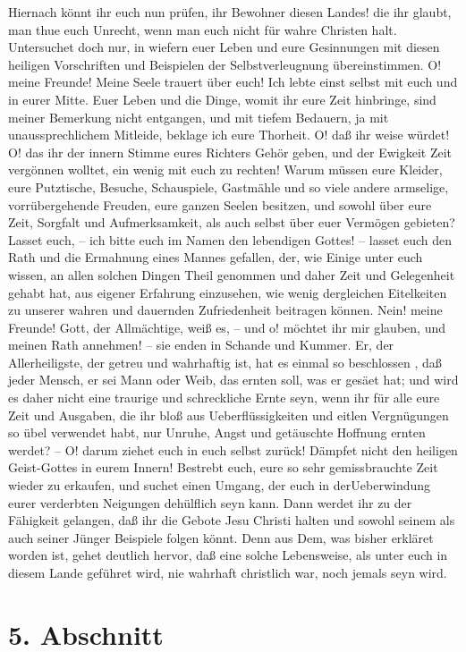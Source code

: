 Hiernach könnt ihr euch nun prüfen, ihr Bewohner diesen Landes! die ihr glaubt,
man thue euch Unrecht, wenn man euch nicht für wahre Christen halt. Untersuchet
doch nur, in wiefern euer Leben und eure Gesinnungen mit diesen heiligen
Vorschriften und Beispielen der Selbstverleugnung übereinstimmen. O! meine
Freunde! Meine Seele trauert über euch! Ich lebte einst selbst mit euch und in
eurer Mitte. Euer Leben und die Dinge, womit ihr eure Zeit hinbringe, sind
meiner Bemerkung nicht entgangen, und mit tiefem Bedauern, ja mit
unaussprechlichem Mitleide, beklage ich eure Thorheit. O! daß ihr weise würdet!
O! das ihr der innern Stimme eures Richters Gehör geben, und der Ewigkeit Zeit
vergönnen wolltet, ein wenig mit euch zu rechten! Warum müssen eure Kleider,
eure Putztische, Besuche, Schauspiele, Gastmähle und so viele andere armselige,
vorrübergehende Freuden, eure ganzen Seelen besitzen, und sowohl über eure Zeit,
Sorgfalt und Aufmerksamkeit, als auch selbst über euer Vermögen gebieten? Lasset
euch, -- ich bitte euch im Namen den lebendigen Gottes! -- lasset euch den Rath
und die Ermahnung eines Mannes gefallen, der, wie Einige unter euch wissen, an
allen solchen Dingen Theil genommen und daher Zeit und Gelegenheit gehabt hat,
aus eigener Erfahrung einzusehen, wie wenig dergleichen Eitelkeiten zu unserer
wahren und dauernden Zufriedenheit beitragen können. Nein! meine Freunde! Gott,
der Allmächtige, weiß es, -- und o! möchtet ihr mir glauben, und meinen Rath
annehmen! -- sie enden in Schande und Kummer. Er, der Allerheiligste, der getreu
und wahrhaftig ist, hat es einmal so beschlossen , daß jeder Mensch, er sei Mann
oder Weib, das ernten soll, was er gesäet hat; und wird es daher nicht eine
traurige und schreckliche Ernte seyn, wenn ihr für alle eure Zeit und Ausgaben,
die ihr bloß aus Ueberflüssigkeiten und eitlen Vergnügungen so übel verwendet
habt, nur Unruhe, Angst und getäuschte Hoffnung ernten werdet? -- O! darum
ziehet euch in euch selbst zurück! Dämpfet nicht den heiligen Geist-Gottes in
eurem Innern! Bestrebt  euch, eure so sehr gemissbrauchte Zeit wieder zu
erkaufen, und suchet einen Umgang, der euch in derUeberwindung eurer verderbten
Neigungen dehülflich seyn kann. Dann werdet ihr zu der Fähigkeit gelangen, daß
ihr die Gebote Jesu Christi halten und sowohl seinem als auch seiner Jünger
Beispiele folgen könnt. Denn aus Dem, was bisher erkläret worden ist, gehet
deutlich hervor, daß eine solche Lebensweise, als unter euch in diesem Lande
geführet wird, nie wahrhaft christlich war, noch jemals seyn wird.

\section{5. Abschnitt}

